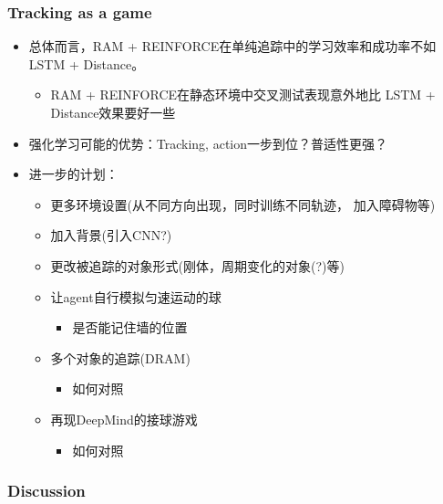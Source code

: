 \documentclass[10pt,CJK]{beamer}
\begin{document}
	\begin{frame}
		\frametitle{Tracking as a game}
		\begin{itemize}
			\item 总体而言，RAM + REINFORCE在单纯追踪中的学习效率和成功率不如
			LSTM + Distance。
			\begin{itemize}
				\item RAM + REINFORCE在静态环境中交叉测试表现意外地比
				LSTM + Distance效果要好一些
			\end{itemize}\pause
			\item 强化学习可能的优势：Tracking, action一步到位？普适性更强？
			\pause
			\item 进一步的计划：
			\begin{itemize}
				\item 更多环境设置(从不同方向出现，同时训练不同轨迹，
				加入障碍物等)\pause
				\item 加入背景(引入CNN?)\pause
				\item 更改被追踪的对象形式(刚体，周期变化的对象(?)等)\pause
				\item 让agent自行模拟匀速运动的球
				\begin{itemize}
					\item 是否能记住墙的位置
				\end{itemize}
				\item 多个对象的追踪(DRAM)
				\begin{itemize}
					\item 如何对照
				\end{itemize}\pause
				\item 再现DeepMind的接球游戏
				\begin{itemize}
					\item 如何对照
				\end{itemize}
			\end{itemize}
		\end{itemize}
	\end{frame}
	
	\begin{frame}
		\frametitle{Discussion}
	\end{frame}
\end{document}

